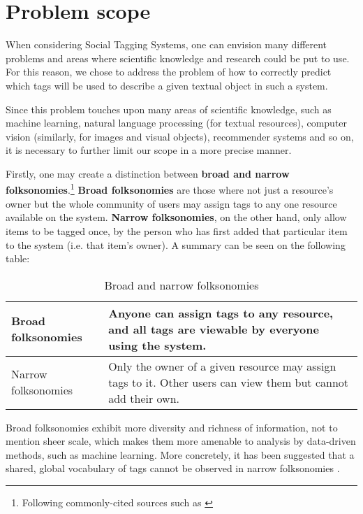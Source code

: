 \section{Problem scope}\label{section:intro_problem}

When considering Social Tagging Systems, one can envision many different problems and areas where scientific knowledge and research could be put to use. For this reason, we chose to address the problem of how to correctly predict which tags will be used to describe a given textual object in such a system. 

Since this problem touches upon many areas of scientific knowledge, such as machine learning, natural language processing (for textual resources), computer vision (similarly, for images and visual objects), recommender systems and so on, it is necessary to further limit our scope in a more precise manner.

Firstly, one may create a distinction between \textbf{broad and narrow folksonomies}.\footnote{Following commonly-cited sources such as \cite{wal_2005_broad_and_narrow}} \textbf{Broad folksonomies} are those where not just a resource's owner but the whole community of users may assign tags to any one resource available on the system. \textbf{Narrow folksonomies}, on the other hand, only allow items to be tagged once, by the person who has first added that particular item to the system (i.e. that item's owner). A summary can be seen on the following table:

\renewcommand{\arraystretch}{1.5}

\begin{table}[!h]
\centering
\caption{Broad and narrow folksonomies}
\begin{tabular}{|m{4cm}|m{8cm}|}
\hline
Broad folksonomies & Anyone can assign tags to any resource, and all tags are viewable by everyone using the system. \\
\hline
Narrow folksonomies & Only the owner of a given resource may assign tags to it. Other users can view them but cannot add their own.\\
\hline
\end{tabular}
\label{tab:broad_vs_narrow}
\end{table}

Broad folksonomies exhibit more diversity and richness of information, not to mention sheer scale, which makes them more amenable to analysis by data-driven methods, such as machine learning. More concretely, it has been suggested that a shared, global vocabulary of tags cannot be observed in narrow folksonomies \citep{schifanella_etal_2010}. 

